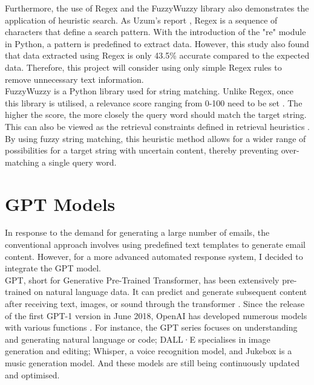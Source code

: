 \documentclass[ oneside,%
                    author={Cassie Qing Tang},
                    degree={BSc},
                     title={The Report for 3D Modelling of Queens Library \\ },
                    subtitle={ }]{dissertation}
\begin{document}
Furthermore, the use of Regex and the FuzzyWuzzy library also demonstrates the application of heuristic search. As Uzum's report \cite{uzun_comparison_2018}, Regex is a sequence of characters that define a search pattern. With the introduction of the "re" module in Python, a pattern is predefined to extract data. However, this study also found that data extracted using Regex is only 43.5\% accurate compared to the expected data. Therefore, this project will consider using only simple Regex rules to remove unnecessary text information. 
\\

FuzzyWuzzy is a Python library used for string matching. Unlike Regex, once this library is utilised, a relevance score ranging from 0-100 need to be set \cite{majumder_fuzzywuzzy_2021}. The higher the score, the more closely the query word should match the target string. This can also be viewed as the retrieval constraints defined in retrieval heuristics \cite{yang_secure_2021}. By using fuzzy string matching, this heuristic method allows for a wider range of possibilities for a target string with uncertain content, thereby preventing over-matching a single query word.


\section{GPT Models}
In response to the demand for generating a large number of emails, the conventional approach involves using predefined text templates to generate email content. However, for a more advanced automated response system, I decided to integrate the GPT model.
\\

GPT, short for Generative Pre-Trained Transformer, has been extensively pre-trained on natural language data. It can predict and generate subsequent content after receiving text, images, or sound through the transformer \cite{3blue1brown_but_2024}. Since the release of the first GPT-1 version in June 2018, OpenAI has developed numerous models with various functions \cite{noauthor_openai_nodate}. For instance, the GPT series focuses on understanding and generating natural language or code; DALL·E specialises in image generation and editing; Whisper, a voice recognition model, and Jukebox is a music generation model. And these models are still being continuously updated and optimised.
\\
\end{document}
